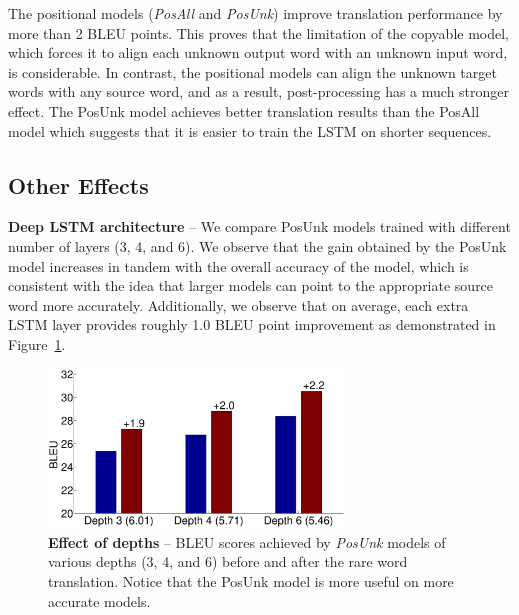 The positional models ({\it PosAll} and {\it PosUnk}) 
improve translation performance by more than 2 BLEU points. 
This proves that the limitation of the copyable model, which forces
it to align each unknown output word with an unknown input word, is considerable.  
In contrast, the positional models can align the unknown target words with any source word,
and as a result, post-processing has a much stronger effect. 
The PosUnk model achieves better translation results than
the PosAll model which suggests that it is easier to train the LSTM on shorter sequences. 

\subsection{Other Effects}
\label{subsec:effects}
{\bf Deep LSTM architecture} --  We compare PosUnk models trained with different number of layers (3, 4, and 6). 
We observe that the gain obtained by the PosUnk model increases in tandem with the overall accuracy of the model, which is consistent 
with the idea that larger models can point to the appropriate source word more accurately.
Additionally, we observe that on average, each extra LSTM layer provides roughly 1.0 BLEU point improvement as demonstrated in Figure~\ref{f:depth}. 

\begin{figure}[tbh!]
\centering
\includegraphics[width=0.7\textwidth, clip=true, trim= 0 0 0 0]{img/3-depth} %
\caption[Effect of depths]{{\bf Effect of depths} -- BLEU scores achieved by {\it PosUnk} models of various depths (3, 4, and 6) before and after the rare word translation. 
 Notice that the PosUnk model is more useful on more accurate models. }
\label{f:depth}
\end{figure}

